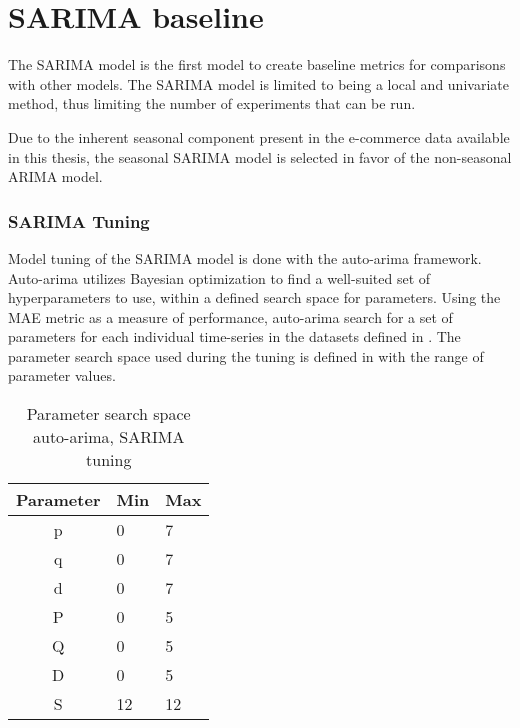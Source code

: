 
\section{SARIMA baseline}
\label{section:Method:SARIMA}

The SARIMA model is the first model to create baseline metrics for comparisons with other models.
The SARIMA model is limited to being a local and univariate method,
thus limiting the number of experiments that can be run.

Due to the inherent seasonal component present in the e-commerce data available in this thesis,
the seasonal SARIMA model is selected in favor of the non-seasonal ARIMA model.

\subsubsection{SARIMA Tuning}
Model tuning of the SARIMA model is done with the auto-arima framework.
Auto-arima utilizes Bayesian optimization to find a well-suited set of hyperparameters to use,
within a defined search space for parameters.
Using the MAE metric as a measure of performance, auto-arima search for a set of parameters for each individual time-series
in the datasets defined in .
The parameter search space used during the tuning is defined in  with the range of parameter values.

\begin{table}[h]
  \centering
  \caption{Parameter search space auto-arima, SARIMA tuning}
  \label{table:method:arima-tuning}
  \begin{tabular}{|c|l|l|}\hline
    Parameter & Min & Max \\ \hline
    p         & 0   & 7   \\ \hline
    q         & 0   & 7   \\ \hline
    d         & 0   & 7   \\ \hline
    P         & 0   & 5   \\ \hline
    Q         & 0   & 5   \\ \hline
    D         & 0   & 5   \\ \hline
    S         & 12   & 12   \\ \hline
  \end{tabular}
\end{table}









